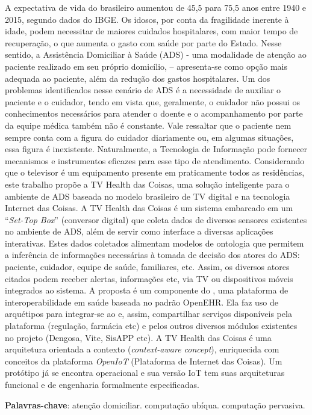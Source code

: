 \setlength{\absparsep}{18pt} %
\begin{resumo}

A expectativa de vida do brasileiro aumentou de 45,5 para 75,5 anos entre 1940 e
2015, segundo dados do IBGE. Os idosos, por conta da fragilidade inerente à
idade, podem necessitar de maiores cuidados hospitalares, com maior tempo de
recuperação, o que aumenta o gasto com saúde por parte do Estado. Nesse sentido,
a Assistência Domiciliar à Saúde (ADS) - uma modalidade de atenção ao paciente
realizado em seu próprio domicílio, – apresenta-se como opção mais adequada ao
paciente, além da redução dos gastos hospitalares. Um dos problemas
identificados nesse cenário de ADS é a necessidade de auxiliar o paciente e o
cuidador, tendo em vista que, geralmente, o cuidador não possui os conhecimentos
necessários para atender o doente e o acompanhamento por parte da equipe médica
também não é  constante. Vale ressaltar que o paciente nem sempre conta com a
figura do cuidador diariamente ou, em algumas situações, essa figura é
inexistente. Naturalmente, a Tecnologia de Informação pode fornecer mecanismos e
instrumentos eficazes para esse tipo de atendimento. Considerando que o
televisor é um equipamento presente em praticamente todos as residências, este
trabalho propõe a TV Health das Coisas, uma solução inteligente para o
ambiente de ADS baseada no modelo brasileiro de TV digital e na tecnologia
Internet das Coisas. A TV Health das Coisas é um sistema embarcado em um ``\textit{Set-Top
Box}'' (conversor digital) que coleta dados de diversos sensores existentes no
ambiente de ADS, além de servir como interface a diversas aplicações
interativas. Estes dados coletados alimentam modelos de ontologia que permitem a
inferência de informações necessárias à tomada de decisão dos atores do ADS:
paciente, cuidador, equipe de saúde, familiares, etc. Assim, os diversos atores
citados podem receber alertas, informações etc, via TV ou dispositivos móveis
integrados ao sistema. A proposta é um componente do \nextsaude[], uma plataforma de
interoperabilidade em saúde baseada no padrão OpenEHR. Ela faz uso de arquétipos
para integrar-se ao \nextsaude[] e, assim, compartilhar serviços disponíveis pela
plataforma (regulação, farmácia etc) e pelos outros diversos módulos existentes
no projeto (Dengosa, Vite, SisAPP etc). A TV Health das Coisas é uma arquitetura orientada a
contexto (\textit{context-aware concept}), enriquecida com conceitos da
plataforma \textit{OpenIoT} (Plataforma de Internet das Coisas). Um protótipo 
já se encontra operacional e sua versão IoT tem suas arquiteturas
funcional e de engenharia formalmente especificadas.

 \textbf{Palavras-chave}: atenção domiciliar. computação ubíqua. computação pervasiva.
 \end{resumo}
